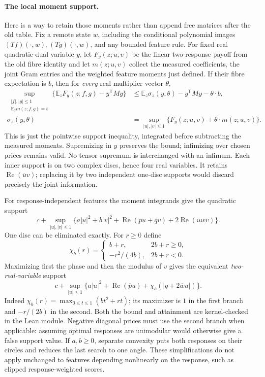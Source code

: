 \paragraph{The local moment support.}
Here is a way to retain those moments rather than append free matrices after
the old table. Fix a remote state $w$, including the conditional polynomial
images $(Tf)(\cdot,w),(Tg)(\cdot,w)$, and any bounded feature rule. For
fixed real quadratic-dual variable $y$, let $F_y(z;u,v)$ be the linear
two-response payoff from the old fibre identity and let
$m(z;u,v)$ collect the measured coefficients, the joint Gram entries and the
weighted feature moments just defined. If their fibre expectation is $b$, then
for \emph{every} real multiplier vector $\theta$,
\begin{align}
 \sup_{\substack{|f|,|g|\le1\\\mathbb E_z m(z;f,g)=b}}
 \{\mathbb E_zF_y(z;f,g)-y^{\mathsf T}My\}
 &\le\mathbb E_z\sigma_z(y,\theta)-y^{\mathsf T}My-\theta\cdot b,
 \label{eq:shared-local-support}\\
 \sigma_z(y,\theta)
 &=\sup_{|u|,|v|\le1}
       \{F_y(z;u,v)+\theta\cdot m(z;u,v)\}.\nonumber
\end{align}
This is just the pointwise support inequality, integrated before subtracting
the measured moments. Supremizing in $y$ preserves the bound; infimizing
over chosen prices remains valid. No tensor supremum is interchanged with an
infimum. Each inner support is on two complex discs, hence four real variables.
It retains $\operatorname{Re}(\overline u v)$; replacing it by two independent
one-disc supports would discard precisely the joint information.

For response-independent features the moment integrands give the quadratic
support
\[
 c+\sup_{|u|,|v|\le1}
 \{a|u|^2+b|v|^2+\operatorname{Re}(\overline p u+\overline q v)
                         +2\operatorname{Re}(\overline u wv)\}.
\]
One disc can be eliminated exactly. For $r\ge0$ define
\[
 \chi_b(r)=\begin{cases}b+r,&2b+r\ge0,\\
                         -r^2/(4b),&2b+r<0.\end{cases}
\]
Maximizing first the phase and then the modulus of $v$ gives the equivalent
\emph{two-real-variable} support
\begin{equation}\label{eq:shared-two-real-support}
 c+\sup_{|u|\le1}\{a|u|^2+\operatorname{Re}(\overline p u)
                   +\chi_b(|q+2\overline w u|)\}.
\end{equation}
Indeed $\chi_b(r)=\max_{0\le t\le1}(bt^2+rt)$; its maximizer is $1$ in
the first branch and $-r/(2b)$ in the second. Both the bound and attainment
are kernel-checked in the Lean module. Negative diagonal prices must use the
second branch when applicable: assuming optimal responses are unimodular
would otherwise give a false support value. If $a,b\ge0$, separate convexity
puts both responses on their circles and reduces the last search to one angle.
These simplifications do not apply unchanged to features depending nonlinearly
on the response, such as clipped response-weighted scores.

